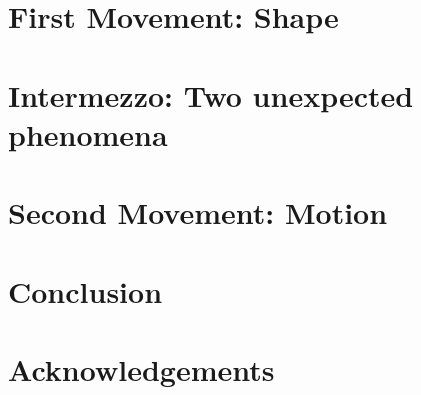 \documentclass[12pt,twoside]{article}
\begin{document}
\begin{JGGarticle}
\section{First Movement: Shape}
\label{sec:act-I}


\section{Intermezzo: Two unexpected phenomena}
\label{sec:intermezzo}


\section{Second Movement: Motion}
\label{sec:act-II}


\section{Conclusion}
\label{sec:conclusion}


\section*{Acknowledgements}


 


\appendix


\end{JGGarticle}
\end{document}
